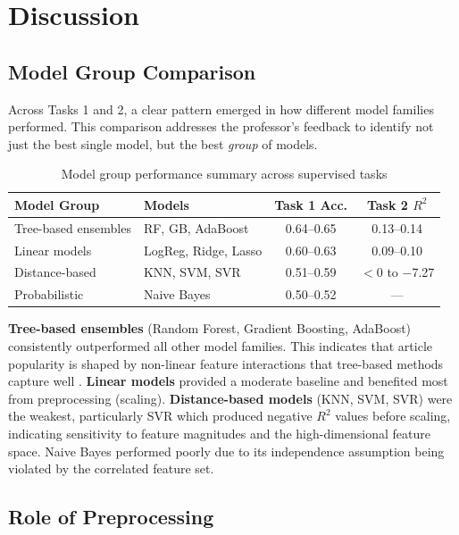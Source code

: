 \section{Discussion}

\subsection{Model Group Comparison}

Across Tasks 1 and 2, a clear pattern emerged in how different model families performed. This comparison addresses the professor's feedback to identify not just the best single model, but the best \textit{group} of models.

\begin{table}[H]
\centering
\caption{Model group performance summary across supervised tasks}
\begin{tabular}{llcc}
\toprule
\textbf{Model Group} & \textbf{Models} & \textbf{Task 1 Acc.} & \textbf{Task 2 $R^2$} \\
\midrule
Tree-based ensembles & RF, GB, AdaBoost & 0.64--0.65 & 0.13--0.14 \\
Linear models & LogReg, Ridge, Lasso & 0.60--0.63 & 0.09--0.10 \\
Distance-based & KNN, SVM, SVR & 0.51--0.59 & $<$0 to $-$7.27 \\
Probabilistic & Naive Bayes & 0.50--0.52 & --- \\
\bottomrule
\end{tabular}
\end{table}

\noindent \textbf{Tree-based ensembles} (Random Forest, Gradient Boosting, AdaBoost) consistently outperformed all other model families. This indicates that article popularity is shaped by non-linear feature interactions that tree-based methods capture well \cite{breiman2001rf,biau2016rf}. \textbf{Linear models} provided a moderate baseline and benefited most from preprocessing (scaling). \textbf{Distance-based models} (KNN, SVM, SVR) were the weakest, particularly SVR which produced negative $R^2$ values before scaling, indicating sensitivity to feature magnitudes and the high-dimensional feature space. Naive Bayes performed poorly due to its independence assumption being violated by the correlated feature set.

\subsection{Role of Preprocessing}

